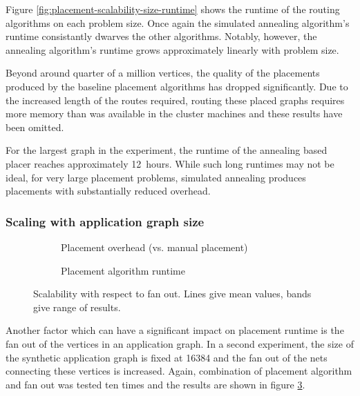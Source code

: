 				Figure \ref{fig:placement-scalability-size-runtime} shows the runtime
				of the routing algorithms on each problem size. Once again the
				simulated annealing algorithm's runtime consistantly dwarves the other
				algorithms. Notably, however, the annealing algorithm's runtime grows
				approximately linearly with problem size.
				
				Beyond around quarter of a million vertices, the quality of the
				placements produced by the baseline placement algorithms has dropped
				significantly. Due to the increased length of the routes required,
				routing these placed graphs requires more memory than was available in
				the cluster machines and these results have been omitted.
				
				For the largest graph in the experiment, the runtime of the annealing
				based placer reaches approximately 12~hours. While such long runtimes
				may not be ideal, for very large placement problems, simulated
				annealing produces placements with substantially reduced overhead.
			
			
			\subsubsection{Scaling with application graph size}
			
				\begin{figure}
					\center
					\begin{subfigure}{\linewidth}
						\center
						
						\caption{Placement overhead (vs. manual placement)}
						\label{fig:placement-scalability-fanout-quality}
					\end{subfigure}
					
					\begin{subfigure}{\linewidth}
						\center
						
						\caption{Placement algorithm runtime}
						\label{fig:placement-scalability-fanout-runtime}
					\end{subfigure}
					
						\caption{Scalability with respect to fan out. Lines give mean values,
						bands give range of results.}
					\label{fig:placement-scalability-fanout}
				\end{figure}
				
				Another factor which can have a significant impact on placement runtime
				is the fan out of the vertices in an application graph. In a second
				experiment, the size of the synthetic application graph is fixed at
				\num{16384} and the fan out of the nets connecting these vertices is
				increased. Again, combination of placement algorithm and fan out was
				tested ten times and the results are shown in figure
				\ref{fig:placement-scalability-fanout}.
				
